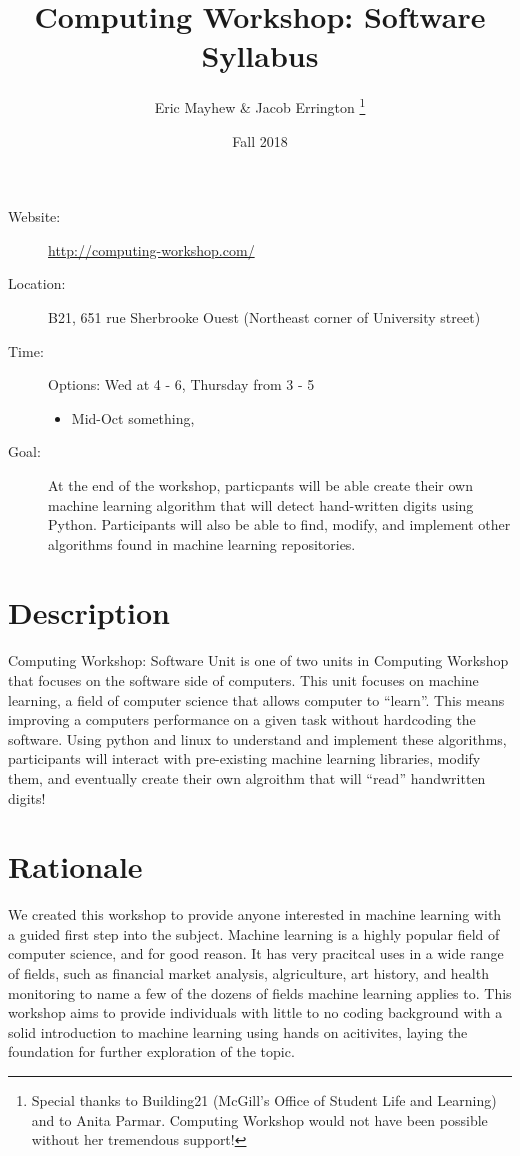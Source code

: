 \documentclass[11pt]{article}
\author{%
  Eric Mayhew \& Jacob Errington%
  \footnote{%
    Special thanks to Building21 (McGill's Office of Student Life and Learning)
    and to Anita Parmar.
    Computing Workshop would not have been possible without her tremendous
    support!
  }
}
\title{Computing Workshop: Software Syllabus}
\date{Fall 2018}
\begin{document}
\maketitle

\begin{description}
  \item[Website:]
    \url{http://computing-workshop.com/}

  \item[Location:]
    B21, 651 rue Sherbrooke Ouest
    (Northeast corner of University street)

  \item[Time:]
    Options: Wed at 4 - 6, Thursday from 3 - 5
    \begin{itemize}
      \item Mid-Oct something,
    \end{itemize}

  \item[Goal:]
    At the end of the workshop, particpants will be able create their own
    machine learning algorithm that will detect hand-written
    digits using Python. Participants will also be able to find, modify, and implement other
    algorithms found in machine learning repositories.

\end{description}

\section*{Description}

Computing Workshop: Software Unit is one of two units in Computing Workshop that
focuses on the software side of computers. This unit focuses on machine
learning, a field of computer science that allows computer to ``learn''. This
means improving a computers performance on a given task without hardcoding the
software. Using python and linux to understand and implement these algorithms,
participants will interact with pre-existing machine learning libraries, modify
them, and eventually create their own algroithm that will ``read'' handwritten digits!

\section*{Rationale}

We created this workshop to provide anyone interested in machine learning with a
guided first step into the subject. Machine learning is a highly popular field
of computer science, and for good reason. It has very pracitcal uses in a wide
range of fields, such as financial market analysis, algriculture, art history,
and health monitoring to name a few of the dozens of fields machine learning
applies to. This workshop aims to provide individuals with little to no coding
background with a solid introduction to machine learning using hands on
acitivites, laying the foundation for further exploration of the topic.
\end{document}
